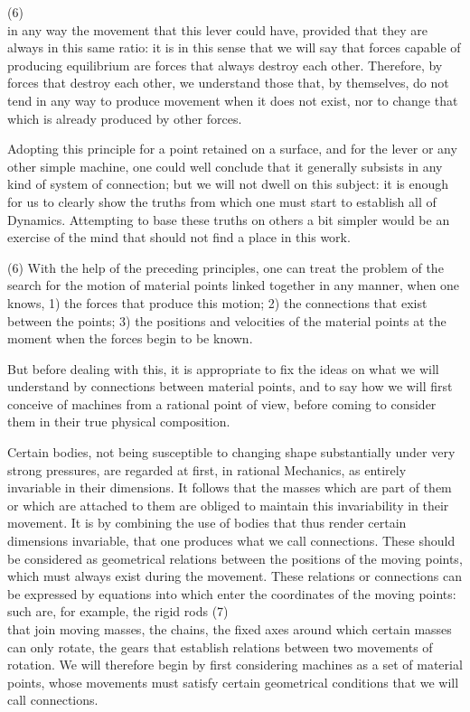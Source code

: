 \documentclass{book}
\begin{document}
\newpage
(6)\\
in any way the movement that this lever could have, provided that they are always in this same ratio: it is in this sense that we will say that forces capable of producing equilibrium are forces that always destroy each other.
Therefore, by forces that destroy each other, we understand those that, by themselves, do not tend in any way to produce movement when it does not exist, nor to change that which is already produced by other forces.

Adopting this principle for a point retained on a surface, and for the lever or any other simple machine, one could well conclude that it generally subsists in any kind of system of connection; but we will not dwell on this subject: it is enough for us to clearly show the truths from which one must start to establish all of Dynamics. Attempting to base these truths on others a bit simpler would be an exercise of the mind that should not find a place in this work.

(6) With the help of the preceding principles, one can treat the problem of the search for the motion of material points linked together in any manner, when one knows, 1) the forces that produce this motion; 2) the connections that exist between the points; 3) the positions and velocities of the material points at the moment when the forces begin to be known.

But before dealing with this, it is appropriate to fix the ideas on what we will understand by connections between material points, and to say how we will first conceive of machines from a rational point of view, before coming to consider them in their true physical composition.

Certain bodies, not being susceptible to changing shape substantially under very strong pressures, are regarded at first, in rational Mechanics, as entirely invariable in their dimensions. It follows that the masses which are part of them or which are attached to them are obliged to maintain this invariability in their movement. It is by combining the use of bodies that thus render certain dimensions invariable, that one produces what we call connections. These should be considered as geometrical relations between the positions of the moving points, which must always exist during the movement. These relations or connections can be expressed by equations into which enter the coordinates of the moving points: such are, for example, the rigid rods 
\newpage
(7) \\
that join moving masses, the chains, the fixed axes around which certain masses can only rotate, the gears that establish relations between two movements of rotation.
We will therefore begin by first considering machines as a set of material points, whose movements must satisfy certain geometrical conditions that we will call connections.
\end{document}
